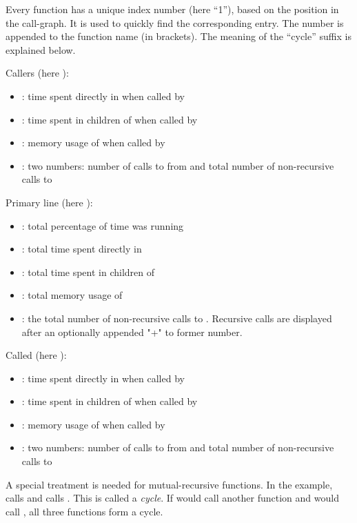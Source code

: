 Every function has a unique index number  (here ``1''), based on the position in the
call-graph. It is used to quickly find the corresponding entry. The number is appended to
the function name (in brackets).
The meaning of the ``cycle'' suffix is explained below.

Callers (here ):
\begin{itemize}
	\item {}:
		time spent directly in  when called by 
	\item {}:
		time spent in children of  when called by 
	\item {}:
		memory usage of  when called by 
	\item {}:
		two numbers:
		number of calls to  from 
		and
		total number of non-recursive calls to 
\end{itemize}

Primary line (here ):
\begin{itemize}
	\item {}:
		total percentage of time  was running
	\item {}:
		total time spent directly in 
	\item {}:
		total time spent in children of 
	\item {}:
		total memory usage of 
	\item {}:
		the total number of non-recursive calls to . Recursive calls are
		displayed after an optionally appended "+" to former number.
\end{itemize}

Called (here ):
\begin{itemize}
	\item {}:
		time spent directly in  when called by 
	\item {}:
		time spent in children of  when called by 
	\item {}:
		memory usage of  when called by 
	\item {}:
		two numbers:
		number of calls to  from 
		and
		total number of non-recursive calls to 
\end{itemize}

A special treatment is needed for mutual-recursive functions. In the example,
 calls  and  calls . This is called a \textit{cycle}.
If  would call another function  and  would call , all three
functions form a cycle.

